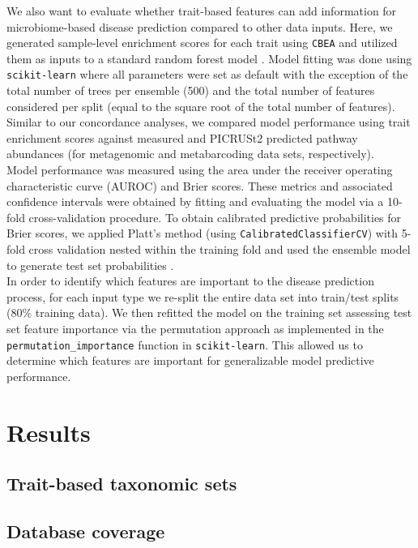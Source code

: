 \documentclass{bmcart}
\begin{document}
We also want to evaluate whether trait-based features can add information for microbiome-based disease prediction compared to other data inputs. Here, we generated sample-level enrichment scores for each trait using \texttt{CBEA} and utilized them as inputs to a standard random forest model \cite{missing}. Model fitting was done using \texttt{scikit-learn} \cite{missing} where all parameters were set as default with the exception of the total number of trees per ensemble (500) and the total number of features considered per split (equal to the square root of the total number of features). Similar to our concordance analyses, we compared model performance using trait enrichment scores against measured and PICRUSt2 predicted pathway abundances (for metagenomic and metabarcoding data sets, respectively).\\
\noindent Model performance was measured using the area under the receiver operating characteristic curve (AUROC) and Brier scores. These metrics and associated confidence intervals were obtained by fitting and evaluating the model via a 10-fold cross-validation procedure. To obtain calibrated predictive probabilities for Brier scores, we applied Platt's method (using \texttt{CalibratedClassifierCV}) with 5-fold cross validation nested within the training fold and used the ensemble model to generate test set probabilities \cite{missing}. \\
\noindent In order to identify which features are important to the disease prediction process, for each input type we re-split the entire data set into train/test splits (80\% training data). We then refitted the model on the training set assessing test set feature importance via the permutation approach as implemented in the \texttt{permutation\_importance} function in \texttt{scikit-learn}. This allowed us to determine which features are important for generalizable model predictive performance.  

\section*{Results}

\subsection*{Trait-based taxonomic sets}

\subsection*{Database coverage}
\end{document}
